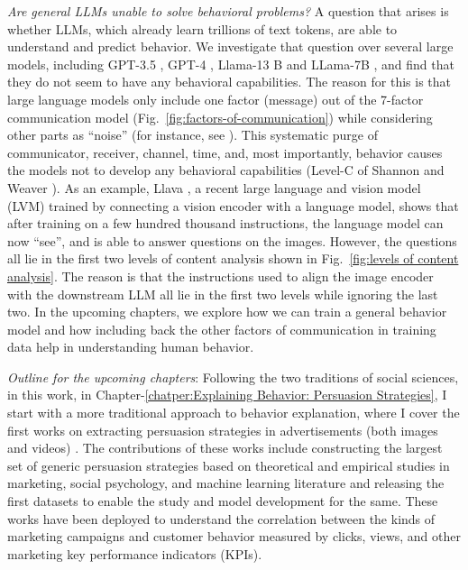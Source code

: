 \documentclass[hidelinks,11pt,a4paper]{report}
\renewcommand{\cite}[1]{\citep{#1}}
\begin{document}
\textit{Are general LLMs unable to solve behavioral problems?} A question that arises is whether LLMs, which already learn trillions of text tokens, are able to understand and predict behavior. We investigate that question over several large models, including GPT-3.5 \cite{brown2020language}, GPT-4 \cite{openai2023gpt4}, Llama-13 B and LLama-7B \cite{touvron2023llama}, and find that they do not seem to have any behavioral capabilities. The reason for this is that large language models only include one factor (message) out of the 7-factor communication model (Fig.~\ref{fig:factors-of-communication}) while considering other parts as ``noise'' (for instance, see \cite{biderman2022datasheet,penedo2023refinedweb}). This systematic purge of communicator, receiver, channel, time, and, most importantly, behavior causes the models not to develop any behavioral capabilities (Level-C of Shannon and Weaver \cite{shannon-weaver-1949}). As an example, Llava \cite{liu2023visual}, a recent large language and vision model (LVM) trained by connecting a vision encoder with a language model, shows that after training on a few hundred thousand instructions, the language model can now ``see'', and is able to answer questions on the images. However, the questions all lie in the first two levels of content analysis shown in Fig.~\ref{fig:levels of content analysis}. The reason is that the instructions used to align the image encoder with the downstream LLM all lie in the first two levels while ignoring the last two. 
In the upcoming chapters, we explore how we can train a general behavior model and how including back the other factors of communication in training data help in understanding human behavior.


\textit{Outline for the upcoming chapters}: Following the two traditions of social sciences, in this work, in Chapter-\ref{chatper:Explaining Behavior: Persuasion Strategies}, I start with a more traditional approach to behavior explanation, where I cover the first works on extracting persuasion strategies in advertisements (both images and videos) \cite{kumar2023persuasion,bhattacharyya-etal-2023-video}. The contributions of these works include constructing the largest set of generic persuasion strategies based on theoretical and empirical studies in marketing, social psychology, and machine learning literature and releasing the first datasets to enable the study and model development for the same. These works have been deployed to understand the correlation between the kinds of marketing campaigns and customer behavior measured by clicks, views, and other marketing key performance indicators (KPIs). 
\end{document}

